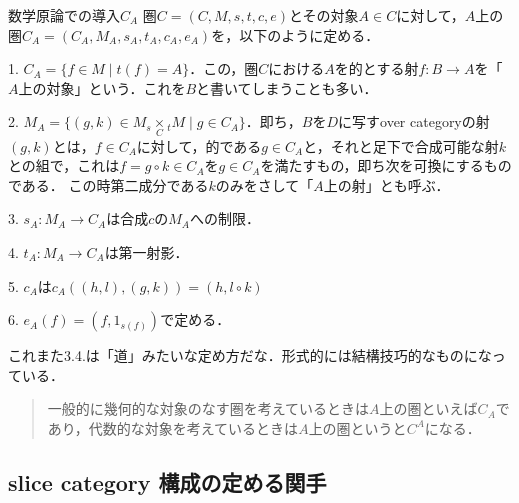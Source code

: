 \documentclass[uplatex, 12pt, dvipdfmx]{jsarticle}
\begin{document}
\begin{itembox}[l]{数学原論での導入$C_A$}
    圏$C=(C,M,s,t,c,e)$とその対象$A\in C$に対して，$A$上の圏$C_A=(C_A, M_A, s_A, t_A, c_A, e_A)$を，以下のように定める．

    1. $C_A=\{ f\in M\mid t(f)=A \}$．この，圏$C$における$A$を的とする射$f:B\to A$を「$A$上の対象」という．これを$B$と書いてしまうことも多い．

    2. $M_A=\{(g,k)\in M_s\underset{C}{\times}{}_tM\mid g\in C_A\}$．即ち，$B$を$D$に写すover categoryの射$(g,k)$とは，$f\in C_A$に対して，的である$g\in C_A$と，それと足下で合成可能な射$k$との組で，これは$f=g\circ k\in C_A$を$g\in C_A$を満たすもの，即ち次を可換にするものである．
    この時第二成分である$k$のみをさして「$A$上の射」とも呼ぶ．
    \begin{center}
    \end{center}

    3. $s_A:M_A\to C_A$は合成$c$の$M_A$への制限．

    4. $t_A:M_A\to C_A$は第一射影．

    5. $c_A$は$c_A((h,l),(g,k))=(h, l\circ k)$
    \begin{center}
    \end{center}

    6. $e_A(f)=(f,1_{s(f)})$で定める．
\end{itembox}
\begin{remark*}
    これまた3.4.は「道」みたいな定め方だな．形式的には結構技巧的なものになっている．
    \begin{quote}
        一般的に幾何的な対象のなす圏を考えているときは$A$上の圏といえば$C_A$であり，代数的な対象を考えているときは$A$上の圏というと$C^A$になる．
    \end{quote}
\end{remark*}

\subsection*{slice category 構成の定める関手}
\end{document}
